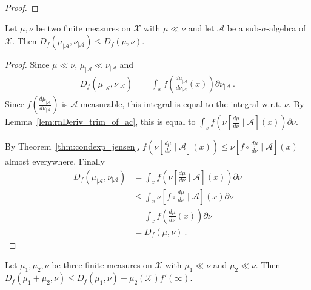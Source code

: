 \begin{proof}\leanok
\end{proof}

\begin{lemma}
  \label{lem:fDiv_trim_le_of_ac}
  \leanok
  Let $\mu, \nu$ be two finite measures on $\mathcal X$ with $\mu \ll \nu$ and let $\mathcal A$ be a sub-$\sigma$-algebra of $\mathcal X$. Then
  $D_f(\mu_{| \mathcal A}, \nu_{| \mathcal A}) \le D_f(\mu, \nu)$.
\end{lemma}

\begin{proof}\leanok
{}
Since $\mu \ll \nu$, $\mu_{| \mathcal A} \ll \nu_{| \mathcal A}$ and
\begin{align*}
D_f(\mu_{| \mathcal A}, \nu_{| \mathcal A})
&= \int_x f \left( \frac{d \mu_{| \mathcal A}}{d \nu_{| \mathcal A}}(x) \right) \partial\nu_{| \mathcal A} \: .
\end{align*}
Since $f \left( \frac{d \mu_{| \mathcal A}}{d \nu_{| \mathcal A}} \right)$ is $\mathcal A$-measurable, this integral is equal to the integral w.r.t. $\nu$.
By Lemma~\ref{lem:rnDeriv_trim_of_ac}, this is equal to $\int_x f \left( \nu\left[ \frac{d \mu}{d \nu} \mid \mathcal A\right] (x) \right) \partial\nu$.

By Theorem~\ref{thm:condexp_jensen}, $f \left( \nu\left[ \frac{d \mu}{d \nu} \mid \mathcal A\right] (x) \right) \le \nu\left[ f \circ \frac{d \mu}{d \nu} \mid \mathcal A\right] (x)$ almost everywhere.
Finally
\begin{align*}
D_f(\mu_{| \mathcal A}, \nu_{| \mathcal A})
&= \int_x f \left( \nu\left[ \frac{d \mu}{d \nu} \mid \mathcal A\right] (x) \right) \partial\nu
\\
&\le \int_x \nu\left[ f \circ \frac{d \mu}{d \nu} \mid \mathcal A\right] (x) \partial\nu
\\
&= \int_x f \left( \frac{d \mu}{d \nu} (x) \right) \partial\nu
\\
&= D_f(\mu, \nu)
\: .
\end{align*}

\end{proof}

\begin{lemma}
  \label{lem:fdiv_add_measure_le_of_ac}
  \leanok
  Let $\mu_1, \mu_2, \nu$ be three finite measures on $\mathcal X$ with $\mu_1 \ll \nu$ and $\mu_2 \ll \nu$. Then
  $D_f(\mu_1 + \mu_2, \nu) \le D_f(\mu_1, \nu) + \mu_2(\mathcal X) f'(\infty)$.
\end{lemma}

